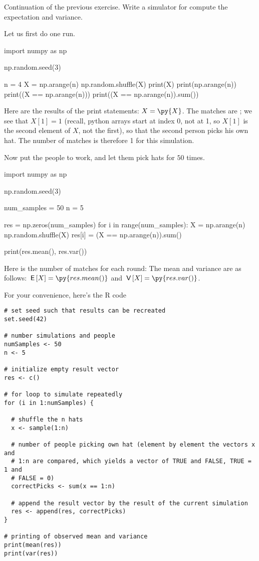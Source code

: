 \begin{exercise}
Continuation of the previous exercise. Write a simulator for compute the expectation and variance.
\begin{solution}
Let us first do one run.
\begin{pyblock}[][numbers=left,frame=lines]
import numpy as np

np.random.seed(3)

n = 4
X = np.arange(n)
np.random.shuffle(X)
print(X)
print(np.arange(n))
print((X == np.arange(n)))
print((X == np.arange(n)).sum())
\end{pyblock}
Here are the results of the print statements: $X = \py{X}$. The matches are ; we see that $X[1] = 1$ (recall, python arrays start at index 0, not at 1, so $X[1]$ is the second element of $X$, not the first), so that the second person picks his own hat. The number of matches is therefore 1 for this simulation.

Now put the people to work, and let them pick hats for $50$ times.
\begin{pyblock}[][numbers=left,frame=lines]
import numpy as np

np.random.seed(3)

num_samples = 50
n = 5

res = np.zeros(num_samples)
for i in range(num_samples):
    X = np.arange(n)
    np.random.shuffle(X)
    res[i] = (X == np.arange(n)).sum()

print(res.mean(), res.var())
\end{pyblock}
Here is the number of matches for each round: 
The mean and variance are as follows: $\E X = \py{res.mean()}$ and $\V X = \py{res.var()}$.

For your convenience, here's the R code
\begin{verbatim}
# set seed such that results can be recreated
set.seed(42)

# number simulations and people
numSamples <- 50
n <- 5

# initialize empty result vector
res <- c()

# for loop to simulate repeatedly
for (i in 1:numSamples) {

  # shuffle the n hats
  x <- sample(1:n)

  # number of people picking own hat (element by element the vectors x and
  # 1:n are compared, which yields a vector of TRUE and FALSE, TRUE = 1 and
  # FALSE = 0)
  correctPicks <- sum(x == 1:n)

  # append the result vector by the result of the current simulation
  res <- append(res, correctPicks)
}

# printing of observed mean and variance
print(mean(res))
print(var(res))
\end{verbatim}
\end{solution}
\end{exercise}

